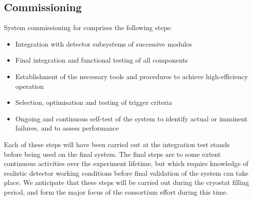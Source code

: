 \subsection{Commissioning}
\label{sec:fdsp-daq-commissioning}

System commissioning for  comprises the following steps:

\begin{itemize}
	\item Integration with detector subsystems of successive modules
	\item Final integration and functional testing of all  components
	\item Establishment of the necessary tools and procedures to achieve high-efficiency operation
	\item Selection, optimisation and testing of trigger criteria
	\item Ongoing and continuous self-test of the system to identify actual or imminent failures, and to assess performance
\end{itemize}

Each of these steps will have been carried out at the integration test stands before being used on the final system. The final steps are to some extent continuous activities over the experiment lifetime, but which require knowledge of realistic detector working conditions before final validation of the system can take place. We anticipate that these steps will be carried out during the cryostat filling period, and form the major focus of the  consortium effort during this time.
